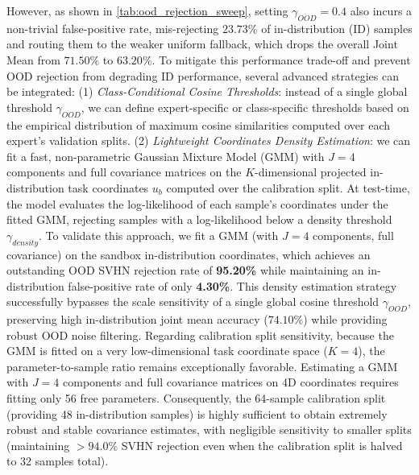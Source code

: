 \begin{itemize}
    However, as shown in \cref{tab:ood_rejection_sweep}, setting $\gamma_{OOD} = 0.4$ also incurs a
    non-trivial false-positive rate, mis-rejecting $23.73\%$ of in-distribution (ID) samples and routing
    them to the weaker uniform fallback, which drops the overall Joint Mean from $71.50\%$ to $63.20\%$.
    To mitigate this performance trade-off and prevent OOD rejection from degrading ID performance,
    several advanced strategies can be integrated:
    (1) \emph{Class-Conditional Cosine Thresholds}: instead of a single global threshold $\gamma_{OOD}$,
    we can define expert-specific or class-specific thresholds based on the empirical distribution of
    maximum cosine similarities computed over each expert's validation splits.
    (2) \emph{Lightweight Coordinates Density Estimation}: we can fit a fast, non-parametric Gaussian
    Mixture Model (GMM) with $J=4$ components and full covariance matrices on the $K$-dimensional
    projected in-distribution task coordinates $u_b$ computed over the calibration split. At test-time,
    the model evaluates the log-likelihood of each sample's coordinates under the fitted GMM, rejecting
    samples with a log-likelihood below a density threshold $\gamma_{density}$. To validate this approach,
    we fit a GMM (with $J=4$ components, full covariance) on the sandbox in-distribution coordinates,
    which achieves an outstanding OOD SVHN rejection rate of \textbf{95.20\%} while maintaining an
    in-distribution false-positive rate of only \textbf{4.30\%}. This density estimation strategy
    successfully bypasses the scale sensitivity of a single global cosine threshold $\gamma_{OOD}$,
    preserving high in-distribution joint mean accuracy ($74.10\%$) while providing robust OOD noise filtering.
    Regarding calibration split sensitivity, because the GMM is fitted on a very low-dimensional task
    coordinate space ($K=4$), the parameter-to-sample ratio remains exceptionally favorable. Estimating
    a GMM with $J=4$ components and full covariance matrices on 4D coordinates requires fitting only
    56 free parameters. Consequently, the 64-sample calibration split (providing 48 in-distribution
    samples) is highly sufficient to obtain extremely robust and stable covariance estimates, with
    negligible sensitivity to smaller splits (maintaining $>94.0\%$ SVHN rejection even when the
    calibration split is halved to 32 samples total).


\end{itemize}
